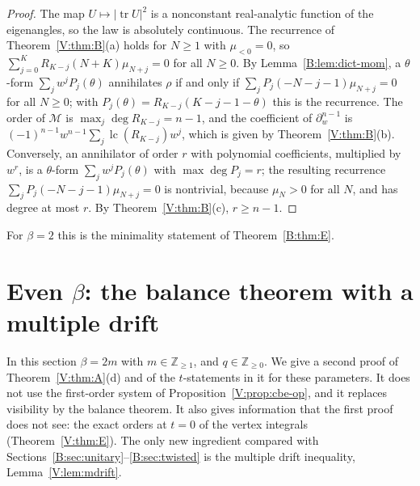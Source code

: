 \documentclass[11pt,a4paper]{article}
\theoremstyle{definition}
\theoremstyle{remark}
\newcommand{\Z}{\mathbb Z}
\DeclareMathOperator{\lc}{lc}
\DeclareMathOperator{\tr}{tr}
\numberwithin{equation}{section}
\begin{document}
\begin{proof}
The map $U\mapsto|\tr U|^2$ is a nonconstant real-analytic function of the eigenangles, so the law is absolutely continuous. The recurrence of Theorem~\ref{V:thm:B}(a) holds for $N\ge1$ with $\mu_{<0}=0$, so $\sum_{j=0}^{K}R_{K-j}(N+K)\mu_{N+j}=0$ for all $N\ge0$. By Lemma~\ref{B:lem:dict-mom}, a $\theta$-form $\sum_jw^jP_j(\theta)$ annihilates $\rho$ if and only if $\sum_jP_j(-N-j-1)\mu_{N+j}=0$ for all $N\ge0$; with $P_j(\theta)=R_{K-j}(K-j-1-\theta)$ this is the recurrence. The order of $\mathcal M$ is $\max_j\deg R_{K-j}=n-1$, and the coefficient of $\partial_w^{n-1}$ is $(-1)^{n-1}w^{n-1}\sum_j\lc(R_{K-j})w^j$, which is given by Theorem~\ref{V:thm:B}(b). Conversely, an annihilator of order $r$ with polynomial coefficients, multiplied by $w^r$, is a $\theta$-form $\sum_jw^jP_j(\theta)$ with $\max\deg P_j=r$; the resulting recurrence $\sum_jP_j(-N-j-1)\mu_{N+j}=0$ is nontrivial, because $\mu_N>0$ for all $N$, and has degree at most $r$. By Theorem~\ref{V:thm:B}(c), $r\ge n-1$.
\end{proof}

For $\beta=2$ this is the minimality statement of Theorem~\ref{B:thm:E}.
\section{Even \texorpdfstring{$\beta$}{beta}: the balance theorem with a multiple drift}\label{V:sec:even}

In this section $\beta=2m$ with $m\in\Z_{\ge1}$, and $q\in\Z_{\ge0}$. We give a second proof of Theorem~\ref{V:thm:A}(d) and of the $t$-statements in it for these parameters. It does not use the first-order system of Proposition~\ref{V:prop:cbe-op}, and it replaces visibility by the balance theorem. It also gives information that the first proof does not see: the exact orders at $t=0$ of the vertex integrals (Theorem~\ref{V:thm:E}). The only new ingredient compared with Sections~\ref{B:sec:unitary}--\ref{B:sec:twisted} is the multiple drift inequality, Lemma~\ref{V:lem:mdrift}.
\end{document}
